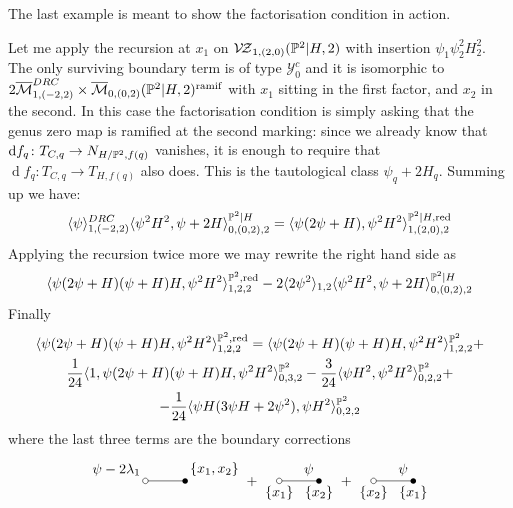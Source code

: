The last example is meant to show the factorisation condition in action.
\begin{ex}
 Let me apply the recursion at $x_1$ on $\mathcal{V\!Z}_{1,(2,0)}(\mathbb P^2|H,2)$ with insertion $\psi_1\psi_2^2H_2^2$. The only surviving boundary term is of type $\mathcal Y^c_0$ and it is isomorphic to $2\overline{\mathcal{M}}^{DRC}_{1,(-2,2)}\times\overline{\mathcal{M}}_{0,(0,2)}(\mathbb P^2|H,2)^{\rm{ramif}}$ with $x_1$ sitting in the first factor, and $x_2$ in the second. In this case the factorisation condition is simply asking that the genus zero map is ramified at the second marking: since we already know that $\operatorname{d}\! f_q\colon T_{C,q}\rightarrow N_{H/\mathbb P^2,f(q)}$ vanishes, it is enough to require that $\operatorname{d}\! f_q\colon T_{C,q}\to T_{H,f(q)}$ also does. This is the tautological class $\psi_q+2H_q$. Summing up we have:
 \[\langle\psi\rangle^{DRC}_{1,(-2,2)}\langle\psi^2H^2,\psi+2H\rangle^{\mathbb P^2|H}_{0,(0,2),2}=\langle\psi(2\psi+H),\psi^2H^2\rangle^{\mathbb P^2|H,\rm{red}}_{1,(2,0),2}\]
 Applying the recursion twice more we may rewrite the right hand side as
 \[\langle\psi(2\psi+H)(\psi+H)H,\psi^2H^2\rangle^{\mathbb P^2,\rm{red}}_{1,2,2}-2\langle2\psi^2\rangle_{1,2}\langle\psi^2H^2,\psi+2H\rangle^{\mathbb P^2|H}_{0,(0,2),2}\]
 Finally
\begin{multline*}
 \langle\psi(2\psi+H)(\psi+H)H,\psi^2H^2\rangle^{\mathbb P^2,\rm{red}}_{1,2,2}=\langle\psi(2\psi+H)(\psi+H)H,\psi^2H^2\rangle^{\mathbb P^2}_{1,2,2}+\\ \frac{1}{24}\langle1,\psi(2\psi+H)(\psi+H)H,\psi^2H^2\rangle^{\mathbb P^2}_{0,3,2}-\frac{3}{24}\langle\psi H^2,\psi^2H^2\rangle^{\mathbb P^2}_{0,2,2}+\\
 -\frac{1}{24}\langle\psi H(3\psi H+2\psi^2),\psi H^2\rangle^{\mathbb P^2}_{0,2,2}
\end{multline*}
where the last three terms are the boundary corrections \[{\tikz[baseline=-3pt]{
\draw (0,0)node[above left]{$\psi-2\lambda_1$} -- (1,0)node[above right]{$\{x_1,x_2\}$};
\draw (0,0) circle(2pt)[fill=white];
\fill (1,0) circle (2pt)}
}+ {\tikz[baseline=-3pt]{
\draw (0,0)node[below]{$\{x_1\}$} -- node[above right]{$\psi$}(1,0)node[below]{$\{x_2\}$};
\draw (0,0) circle(2pt)[fill=white];
\fill (1,0) circle (2pt)}
}+ {\tikz[baseline=-3pt]{
\draw (0,0)node[below]{$\{x_2\}$} -- node[above right]{$\psi$}(1,0)node[below]{$\{x_1\}$};
\draw (0,0) circle(2pt)[fill=white];
\fill (1,0) circle (2pt)}
}
\]
\end{ex}
